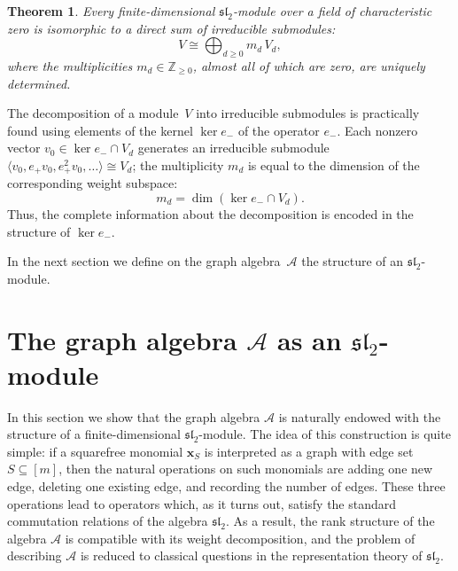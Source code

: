 \documentclass[12pt,reqno]{amsart}
\newtheorem{theorem}{Theorem}[section]
\begin{document}
\begin{theorem}\label{complete_reducibility_sl2}
  Every finite-dimensional $\mathfrak{sl}_2$-module over a field of
  characteristic zero is isomorphic to a direct sum of irreducible
  submodules:
  $$
    V \cong \bigoplus_{d \ge 0} m_d\, V_d,
  $$
  where the multiplicities $m_d \in \mathbb{Z}_{\ge 0}$, almost all of which
  are zero, are uniquely determined.
\end{theorem}

\medskip
The decomposition of a module~$V$ into irreducible submodules is practically
found using elements of the kernel $\ker e_-$ of the operator $e_-$.
Each nonzero vector $v_0 \in \ker e_- \cap V_{d}$ generates an irreducible
submodule
$\langle v_0, e_+v_0, e_+^2v_0, \dots \rangle \cong V_d$;
the multiplicity $m_d$ is equal to the dimension of the corresponding weight
subspace:
$$
  m_d = \dim(\ker e_- \cap V_{d}).
$$
Thus, the complete information about the decomposition is encoded in the
structure of $\ker e_-$.

\medskip

In the next section we define on the graph algebra~$\mathcal{A}$ the
structure of an $\mathfrak{sl}_2$-module.








\section{The graph algebra $\mathcal A$ as an $\mathfrak{sl}_2$-module}

In this section we show that the graph algebra $\mathcal A$ is naturally
endowed with the structure of a finite-dimensional $\mathfrak{sl}_2$-module.
The idea of this construction is quite simple: if a squarefree monomial
$\boldsymbol{x}_S$ is interpreted as a graph with edge set $S\subseteq[m]$,
then the natural operations on such monomials are adding one new edge,
deleting one existing edge, and recording the number of edges.
These three operations lead to operators which, as it turns out, satisfy the
standard commutation relations of the algebra $\mathfrak{sl}_2$.
As a result, the rank structure of the algebra $\mathcal A$ is compatible
with its weight decomposition, and the problem of describing $\mathcal A$
is reduced to classical questions in the representation theory of
$\mathfrak{sl}_2$.
\end{document}
